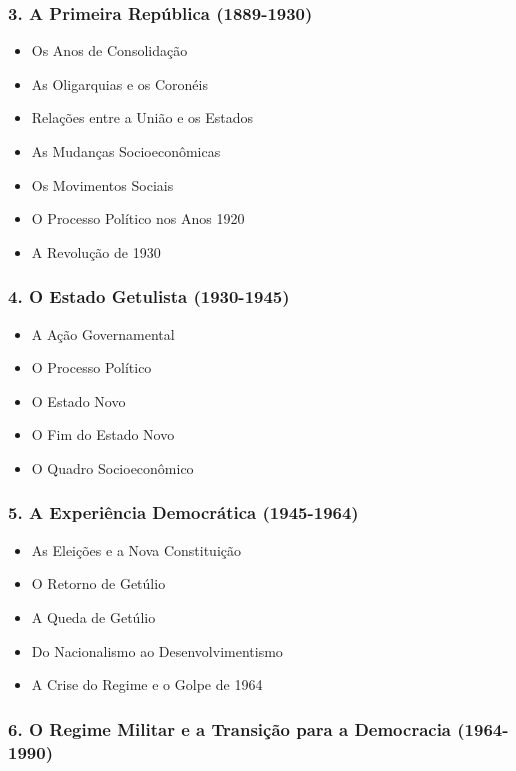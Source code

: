 \documentclass[a4paper,12pt]{article}[abntex2]
\begin{document}
\subsubsection*{3. A Primeira República (1889-1930)}

\begin{itemize}
\item Os Anos de Consolidação
\item As Oligarquias e os Coronéis
\item Relações entre a União e os Estados
\item As Mudanças Socioeconômicas
\item Os Movimentos Sociais
\item O Processo Político nos Anos 1920
\item A Revolução de 1930
\end{itemize}
\subsubsection*{4. O Estado Getulista (1930-1945)}

\begin{itemize}
\item A Ação Governamental
\item O Processo Político
\item O Estado Novo
\item O Fim do Estado Novo
\item O Quadro Socioeconômico
\end{itemize}
\subsubsection*{5. A Experiência Democrática (1945-1964)}

\begin{itemize}
\item As Eleições e a Nova Constituição
\item O Retorno de Getúlio
\item A Queda de Getúlio
\item Do Nacionalismo ao Desenvolvimentismo
\item A Crise do Regime e o Golpe de 1964
\end{itemize}
\subsubsection*{6. O Regime Militar e a Transição para a Democracia (1964-1990)}
\end{document}
